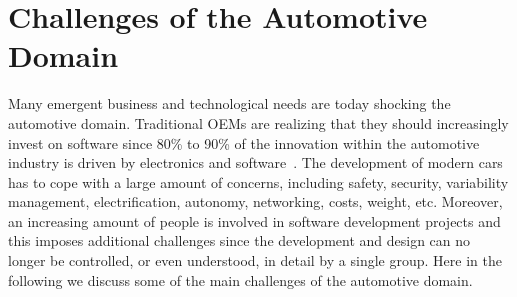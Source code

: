\section{Challenges of the Automotive Domain}\label{sec:challenges}

Many emergent business and technological needs are today shocking the automotive domain. Traditional OEMs are realizing that they should increasingly invest on software since 80\% to 90\% of the innovation within the automotive industry
is driven by electronics and software~\cite{softwareAutomotive}. The development of modern cars has to cope with a large amount of concerns, including safety, security, variability management, electrification, autonomy, networking, costs, weight, etc. Moreover, an increasing amount of people is involved in software development projects and this imposes additional challenges since the development and design can no longer be controlled, or even understood, in detail by
a single group. Here in the following we discuss some of the main challenges of the automotive domain.

